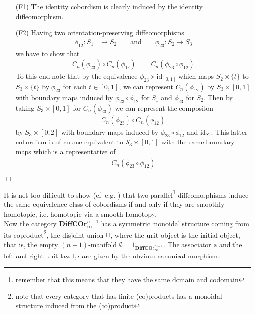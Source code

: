 \begin{prf}
\begin{enumerate}
\item[(F1)]
The identity cobordism is clearly induced by the identity diffeomorphism.

\item[(F2)]
Having two orientation-preserving diffeomorphisms
\begin{align*}
  \phi_{12}
  \colon
  S_{1}
  &\to
  S_{2}
  \qquad
  \text{and}
  \qquad
  \phi_{23}
  \colon
  S_{2}
  \to S_{3}
\end{align*}
we have to show that
\begin{align*}
  C_{n}(\phi_{23})
  \circ
  C_{n}(\phi_{12})
  &=
  C_{n}(\phi_{23} \circ \phi_{12})
\end{align*}
To this end note that by the equivalence $\phi_{23} \times \mathrm{id}_{[0,1]}$ which maps $S_{2} \times \lbrace t \rbrace$ to $S_{3} \times \lbrace t \rbrace$ by $\phi_{23}$ for each $t \in [0,1]$, we can represent $C_{n}(\phi_{12})$ by $S_{3} \times [0,1]$ with boundary maps induced by $\phi_{23} \circ \phi_{12}$ for $S_{1}$ and $\phi_{23}$ for $S_{2}$. Then by taking $S_{3} \times [0,1]$ for $C_{n}(\phi_{23})$ we can represent the compositon
\begin{align*}
  C_{n}(\phi_{23})
  \circ
  C_{n}(\phi_{12})
\end{align*}
by $S_{3} \times [0,2]$ with boundary maps induced by $\phi_{23} \circ \phi_{12}$ and $\mathrm{id}_{S_{3}}$. This latter cobordism is of course equivalent to $S_{3} \times [0,1]$ with the same boundary maps which is a representative of
\begin{align*}
  C_{n}(\phi_{23} \circ \phi_{12})
\end{align*}
\end{enumerate}
\phantom{proven}
\hfill
$\Box$
\end{prf}
It is not too difficult to show (cf. e.g. \cite{bf5195ee}) that two parallel\footnote{remember that this means that they have the same domain and codomain} diffeomorphisms induce the same equivalence class of cobordisms if and only if they are smoothly homotopic, i.e. homotopic via a smooth homotopy.
\\
Now the category $\mathbf{DiffCOr}_{\infty}^{n - 1}$ has a symmetric monoidal structure coming from its coproduct\footnote{note that every category that has finite (co)products has a monoidal structure induced from the (co)product}, the disjoint union $\sqcup$, where the unit object is the initial object, that is, the empty $(n - 1)$-manifold $\emptyset = 1_{\mathbf{DiffCOr}_{\infty}^{n - 1}}$. The associator $\mathsf{a}$ and the left and right unit law $\mathsf{l},\mathsf{r}$ are given by the obvious canonical morphisms
